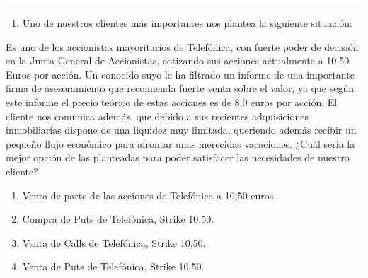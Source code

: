 \documentclass[
  letterpaper,
  DIV=11,
  numbers=noendperiod]{scrreprt}
\providecommand{\tightlist}{%
  \setlength{\itemsep}{0pt}\setlength{\parskip}{0pt}}\usepackage{longtable,booktabs,array}
\begin{document}
\begin{center}\rule{0.5\linewidth}{0.5pt}\end{center}

\begin{enumerate}
\def\labelenumi{\arabic{enumi}.}
\setcounter{enumi}{19}
\tightlist
\item
  Uno de nuestros clientes más importantes nos plantea la siguiente
  situación:
\end{enumerate}

Es uno de los accionistas mayoritarios de Telefónica, con fuerte poder
de decisión en la Junta General de Accionistas, cotizando sus acciones
actualmente a 10,50 Euros por acción. Un conocido suyo le ha filtrado un
informe de una importante firma de asesoramiento que recomienda fuerte
venta sobre el valor, ya que según este informe el precio teórico de
estas acciones es de 8,0 euros por acción. El cliente nos comunica
además, que debido a sus recientes adquisiciones inmobiliarias dispone
de una liquidez muy limitada, queriendo además recibir un pequeño flujo
económico para afrontar unas merecidas vacaciones. ¿Cuál sería la mejor
opción de las planteadas para poder satisfacer las necesidades de
nuestro cliente?

\begin{enumerate}
\def\labelenumi{\alph{enumi})}
\item
  Venta de parte de las acciones de Telefónica a 10,50 euros.
\item
  Compra de Puts de Telefónica, Strike 10,50.
\item
  Venta de Calls de Telefónica, Strike 10,50.
\item
  Venta de Puts de Telefónica, Strike 10,50.
\end{enumerate}
\end{document}
